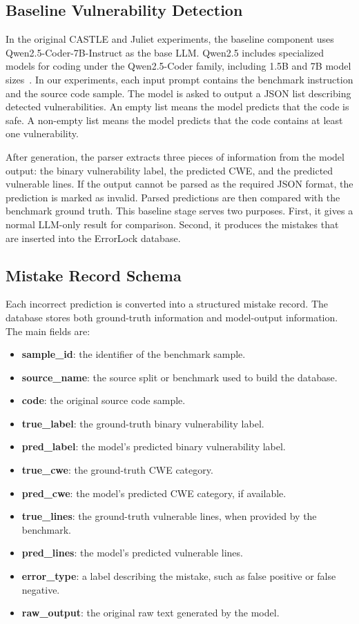 \subsection{Baseline Vulnerability Detection}

In the original CASTLE and Juliet experiments, the baseline component uses Qwen2.5-Coder-7B-Instruct as the base LLM. Qwen2.5 includes specialized models for coding under the Qwen2.5-Coder family, including 1.5B and 7B model sizes~\cite{qwen25coder}. In our experiments, each input prompt contains the benchmark instruction and the source code sample. The model is asked to output a JSON list describing detected vulnerabilities. An empty list means the model predicts that the code is safe. A non-empty list means the model predicts that the code contains at least one vulnerability.

After generation, the parser extracts three pieces of information from the model output: the binary vulnerability label, the predicted CWE, and the predicted vulnerable lines. If the output cannot be parsed as the required JSON format, the prediction is marked as invalid. Parsed predictions are then compared with the benchmark ground truth. This baseline stage serves two purposes. First, it gives a normal LLM-only result for comparison. Second, it produces the mistakes that are inserted into the ErrorLock database.

\subsection{Mistake Record Schema}

Each incorrect prediction is converted into a structured mistake record. The database stores both ground-truth information and model-output information. The main fields are:

\begin{itemize}
    \item \textbf{sample\_id}: the identifier of the benchmark sample.
    \item \textbf{source\_name}: the source split or benchmark used to build the database.
    \item \textbf{code}: the original source code sample.
    \item \textbf{true\_label}: the ground-truth binary vulnerability label.
    \item \textbf{pred\_label}: the model's predicted binary vulnerability label.
    \item \textbf{true\_cwe}: the ground-truth CWE category.
    \item \textbf{pred\_cwe}: the model's predicted CWE category, if available.
    \item \textbf{true\_lines}: the ground-truth vulnerable lines, when provided by the benchmark.
    \item \textbf{pred\_lines}: the model's predicted vulnerable lines.
    \item \textbf{error\_type}: a label describing the mistake, such as false positive or false negative.
    \item \textbf{raw\_output}: the original raw text generated by the model.
\end{itemize}

